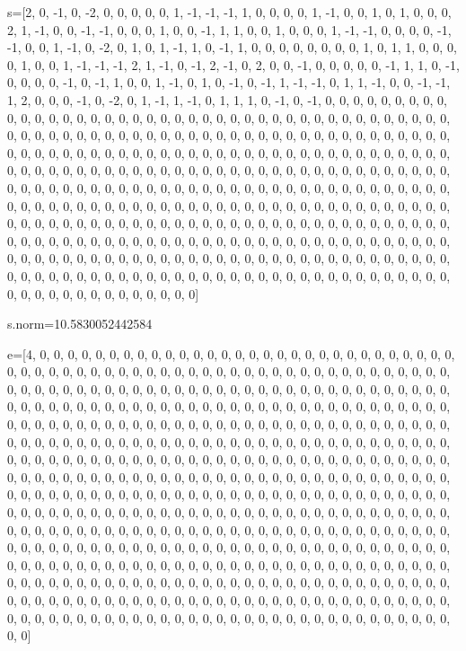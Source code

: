 \documentclass[12pt,a4paper]{article}
\numberwithin{equation}{section}
\begin{document}
s=[2, 0, -1, 0, -2, 0, 0, 0, 0, 0, 1, -1, -1, -1, 1, 0, 0, 0, 0, 1, -1, 0, 0, 1, 0, 1, 0, 0, 0, 2, 1, -1, 0, 0, -1, -1, 0, 0, 0, 1, 0, 0, -1, 1, 1, 0, 0, 1, 0, 0, 0, 1, -1, -1, 0, 0, 0, 0, -1, -1, 0, 0, 1, -1, 0, -2, 0, 1, 0, 1, -1, 1, 0, -1, 1, 0, 0, 0, 0, 0, 0, 0, 0, 1, 0, 1, 1, 0, 0, 0, 0, 1, 0, 0, 1, -1, -1, -1, 2, 1, -1, 0, -1, 2, -1, 0, 2, 0, 0, -1, 0, 0, 0, 0, 0, -1, 1, 1, 0, -1, 0, 0, 0, 0, -1, 0, -1, 1, 0, 0, 1, -1, 0, 1, 0, -1, 0, -1, 1, -1, -1, 0, 1, 1, -1, 0, 0, -1, -1, 1, 2, 0, 0, 0, -1, 0, -2, 0, 1, -1, 1, -1, 0, 1, 1, 1, 0, -1, 0, -1, 0, 0, 0, 0, 0, 0, 0, 0, 0, 0, 0, 0, 0, 0, 0, 0, 0, 0, 0, 0, 0, 0, 0, 0, 0, 0, 0, 0, 0, 0, 0, 0, 0, 0, 0, 0, 0, 0, 0, 0, 0, 0, 0, 0, 0, 0, 0, 0, 0, 0, 0, 0, 0, 0, 0, 0, 0, 0, 0, 0, 0, 0, 0, 0, 0, 0, 0, 0, 0, 0, 0, 0, 0, 0, 0, 0, 0, 0, 0, 0, 0, 0, 0, 0, 0, 0, 0, 0, 0, 0, 0, 0, 0, 0, 0, 0, 0, 0, 0, 0, 0, 0, 0, 0, 0, 0, 0, 0, 0, 0, 0, 0, 0, 0, 0, 0, 0, 0, 0, 0, 0, 0, 0, 0, 0, 0, 0, 0, 0, 0, 0, 0, 0, 0, 0, 0, 0, 0, 0, 0, 0, 0, 0, 0, 0, 0, 0, 0, 0, 0, 0, 0, 0, 0, 0, 0, 0, 0, 0, 0, 0, 0, 0, 0, 0, 0, 0, 0, 0, 0, 0, 0, 0, 0, 0, 0, 0, 0, 0, 0, 0, 0, 0, 0, 0, 0, 0, 0, 0, 0, 0, 0, 0, 0, 0, 0, 0, 0, 0, 0, 0, 0, 0, 0, 0, 0, 0, 0, 0, 0, 0, 0, 0, 0, 0, 0, 0, 0, 0, 0, 0, 0, 0, 0, 0, 0, 0, 0, 0, 0, 0, 0, 0, 0, 0, 0, 0, 0, 0, 0, 0, 0, 0, 0, 0, 0, 0, 0, 0, 0, 0, 0, 0, 0, 0, 0, 0, 0, 0, 0, 0, 0, 0, 0, 0, 0, 0, 0, 0, 0, 0, 0, 0, 0, 0, 0, 0, 0, 0, 0, 0, 0, 0, 0, 0, 0, 0, 0, 0, 0, 0, 0, 0, 0, 0, 0, 0, 0, 0, 0, 0, 0, 0, 0, 0, 0, 0, 0, 0, 0, 0, 0, 0, 0, 0, 0, 0, 0, 0, 0, 0, 0, 0, 0, 0, 0, 0, 0, 0, 0, 0, 0, 0, 0, 0, 0, 0, 0, 0, 0, 0, 0, 0]

s.norm=10.5830052442584

\hspace*{\fill}

e=[4, 0, 0, 0, 0, 0, 0, 0, 0, 0, 0, 0, 0, 0, 0, 0, 0, 0, 0, 0, 0, 0, 0, 0, 0, 0, 0, 0, 0, 0, 0, 0, 0, 0, 0, 0, 0, 0, 0, 0, 0, 0, 0, 0, 0, 0, 0, 0, 0, 0, 0, 0, 0, 0, 0, 0, 0, 0, 0, 0, 0, 0, 0, 0, 0, 0, 0, 0, 0, 0, 0, 0, 0, 0, 0, 0, 0, 0, 0, 0, 0, 0, 0, 0, 0, 0, 0, 0, 0, 0, 0, 0, 0, 0, 0, 0, 0, 0, 0, 0, 0, 0, 0, 0, 0, 0, 0, 0, 0, 0, 0, 0, 0, 0, 0, 0, 0, 0, 0, 0, 0, 0, 0, 0, 0, 0, 0, 0, 0, 0, 0, 0, 0, 0, 0, 0, 0, 0, 0, 0, 0, 0, 0, 0, 0, 0, 0, 0, 0, 0, 0, 0, 0, 0, 0, 0, 0, 0, 0, 0, 0, 0, 0, 0, 0, 0, 0, 0, 0, 0, 0, 0, 0, 0, 0, 0, 0, 0, 0, 0, 0, 0, 0, 0, 0, 0, 0, 0, 0, 0, 0, 0, 0, 0, 0, 0, 0, 0, 0, 0, 0, 0, 0, 0, 0, 0, 0, 0, 0, 0, 0, 0, 0, 0, 0, 0, 0, 0, 0, 0, 0, 0, 0, 0, 0, 0, 0, 0, 0, 0, 0, 0, 0, 0, 0, 0, 0, 0, 0, 0, 0, 0, 0, 0, 0, 0, 0, 0, 0, 0, 0, 0, 0, 0, 0, 0, 0, 0, 0, 0, 0, 0, 0, 0, 0, 0, 0, 0, 0, 0, 0, 0, 0, 0, 0, 0, 0, 0, 0, 0, 0, 0, 0, 0, 0, 0, 0, 0, 0, 0, 0, 0, 0, 0, 0, 0, 0, 0, 0, 0, 0, 0, 0, 0, 0, 0, 0, 0, 0, 0, 0, 0, 0, 0, 0, 0, 0, 0, 0, 0, 0, 0, 0, 0, 0, 0, 0, 0, 0, 0, 0, 0, 0, 0, 0, 0, 0, 0, 0, 0, 0, 0, 0, 0, 0, 0, 0, 0, 0, 0, 0, 0, 0, 0, 0, 0, 0, 0, 0, 0, 0, 0, 0, 0, 0, 0, 0, 0, 0, 0, 0, 0, 0, 0, 0, 0, 0, 0, 0, 0, 0, 0, 0, 0, 0, 0, 0, 0, 0, 0, 0, 0, 0, 0, 0, 0, 0, 0, 0, 0, 0, 0, 0, 0, 0, 0, 0, 0, 0, 0, 0, 0, 0, 0, 0, 0, 0, 0, 0, 0, 0, 0, 0, 0, 0, 0, 0, 0, 0, 0, 0, 0, 0, 0, 0, 0, 0, 0, 0, 0, 0, 0, 0, 0, 0, 0, 0, 0, 0, 0, 0, 0, 0, 0, 0, 0, 0, 0, 0, 0, 0, 0, 0, 0, 0, 0, 0, 0, 0, 0, 0, 0, 0, 0, 0, 0, 0, 0, 0, 0, 0, 0, 0, 0, 0, 0, 0, 0, 0, 0, 0, 0, 0, 0, 0, 0, 0, 0, 0, 0, 0, 0, 0, 0, 0, 0, 0, 0, 0, 0, 0, 0, 0]
\end{document}
